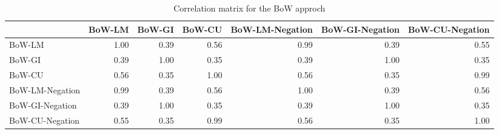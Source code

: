 \begin{table}
\caption{Correlation matrix for the BoW approch}
\label{tab:bow_corr}
\begin{tabular}{lrrrrrr}
\toprule
 & BoW-LM & BoW-GI & BoW-CU & BoW-LM-Negation & BoW-GI-Negation & BoW-CU-Negation \\
\midrule
BoW-LM & 1.00 & 0.39 & 0.56 & 0.99 & 0.39 & 0.55 \\
BoW-GI & 0.39 & 1.00 & 0.35 & 0.39 & 1.00 & 0.35 \\
BoW-CU & 0.56 & 0.35 & 1.00 & 0.56 & 0.35 & 0.99 \\
BoW-LM-Negation & 0.99 & 0.39 & 0.56 & 1.00 & 0.39 & 0.56 \\
BoW-GI-Negation & 0.39 & 1.00 & 0.35 & 0.39 & 1.00 & 0.35 \\
BoW-CU-Negation & 0.55 & 0.35 & 0.99 & 0.56 & 0.35 & 1.00 \\
\bottomrule
\end{tabular}
\end{table}
